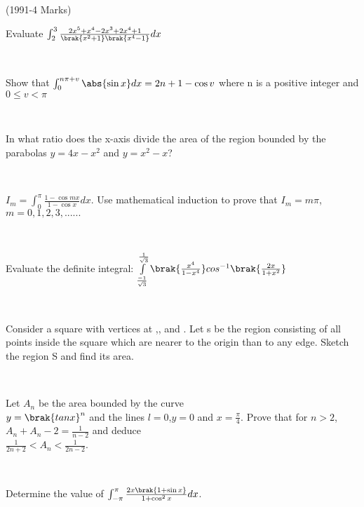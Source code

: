 \hfill{(1991-4 Marks)}\\

\item  Evaluate $\int_{2}^{3}\frac{2x^5+x^4-2x^3+2x^4+1}{\brak{x^2+1}\brak{x^4-1}}dx$

\hfill{}\\

\item  Show that $\int_{0}^{n\pi+v}\abs{\sin x}dx=2n+1-\cos v$ where n is a positive integer and $0 \leq v < \pi$

\hfill{}\\

\item  In what ratio does the x-axis divide the area of the region bounded by the parabolas $y=4x-x^2$ and $y=x^2-x$?

\hfill{}\\

\item  $I_m=\int_{0}^{\pi}\frac{1-\cos mx}{1-\cos x}dx$. Use mathematical induction to prove that $I_m=m\pi$, $m=0,1,2,3,......$

\hfill{}\\

\item  Evaluate the definite integral:
$\int\limits_{\frac{-1}{\sqrt{3}}}^{\frac{1}{\sqrt{3}}}\brak{\frac{x^4}{1-x^4}}
cos^{-1}\brak{\frac{2x}{1+x^2}}$

\hfill{}\\

\item  Consider a square with vertices at ,, and . Let s be the region consisting of all points inside  the square which are nearer to the origin than to any edge. Sketch the region S and find its area.

\hfill{}\\

\item  Let $A_n$ be the area bounded by the curve\\ $y=\brak{tanx}^n$ and the lines $l=0$,$y=0$ and $x=\frac{\pi}{4}$. Prove that for $n>2$, $A_n+A_n-2=\frac{1}{n-2}$ and deduce\\ $\frac{1}{2n+2}<A_n<\frac{1}{2n-2}$.


\hfill{}\\

\item  Determine the value of $\int_{-\pi}^{\pi}\frac{2x\brak{1+\sin x}}{1+\cos ^2x}dx$.


